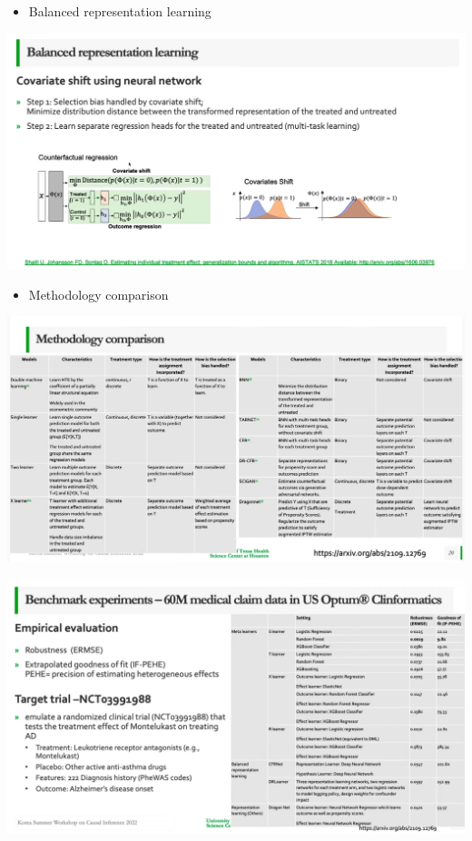 \documentclass[
]{book}
\providecommand{\tightlist}{%
  \setlength{\itemsep}{0pt}\setlength{\parskip}{0pt}}
\theoremstyle{definition}
\theoremstyle{definition}
\theoremstyle{definition}
\theoremstyle{definition}
\theoremstyle{remark}
\begin{document}
\begin{itemize}
\tightlist
\item
  Balanced representation learning
\end{itemize}

\includegraphics{figures/16.png}

\begin{itemize}
\tightlist
\item
  Methodology comparison
\end{itemize}

\includegraphics{figures/17.png}

\includegraphics{figures/18.png}
\end{document}
